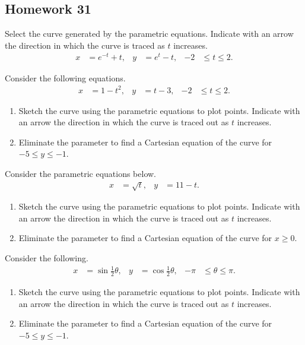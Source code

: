 \subsection{Homework 31}
\begin{problem}[WebAssign HW 31, \# 1]
Select the curve generated by the parametric equations. Indicate with an
arrow the direction in which the curve is traced as $t$ increases.
\[
  \begin{aligned}
    x&=e^{-t}+t,&y&=e^t-t,&-2&\leq t\leq 2.
  \end{aligned}
\]
\end{problem}
\begin{problem}[WebAssign HW 31, \# 2]
Consider the following equations.
\[
  \begin{aligned}
    x&=1-t^2,&y&=t-3,&-2&\leq t\leq 2.
  \end{aligned}
\]
\begin{enumerate}[label=(\alph*)]
\item Sketch the curve using the parametric equations to plot
  points. Indicate with an arrow the direction in which the curve is traced
  out as $t$ increases.
\item Eliminate the parameter to find a Cartesian equation of the curve for
  $-5\leq y\leq -1$.
\end{enumerate}
\end{problem}
\begin{problem}[WebAssign HW 31, \# 3]
Consider the parametric equations below.
\[
  \begin{aligned}
    x&=\sqrt{t},&y&=11-t.
  \end{aligned}
\]
\begin{enumerate}[label=(\alph*)]
\item Sketch the curve using the parametric equations to plot
  points. Indicate with an arrow the direction in which the curve is traced
  out as $t$ increases.
\item Eliminate the parameter to find a Cartesian equation of the curve for
  $x\geq 0$.
\end{enumerate}
\end{problem}
\begin{problem}[WebAssign HW 31, \# 4]
Consider the following.
\[
  \begin{aligned}
    x&=\sin\tfrac{1}{2}\theta,
    &y&=\cos\tfrac{1}{2}\theta,
    &-\pi&\leq\theta\leq\pi.
  \end{aligned}
\]
\begin{enumerate}[label=(\alph*)]
\item Sketch the curve using the parametric equations to plot
  points. Indicate with an arrow the direction in which the curve is traced
  out as $t$ increases.
\item Eliminate the parameter to find a Cartesian equation of the curve for
  $-5\leq y\leq -1$.
\end{enumerate}
\end{problem}
